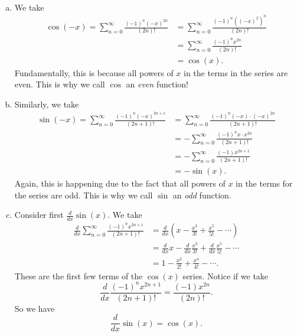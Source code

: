 \documentclass[12pt]{article} %
\begin{document}
\begin{solution}~
\begin{enumerate}[(a)]
    \item We take
    \begin{align*}
        \cos(-x)=\sum_{n=0}^\infty \frac{(-1)^n (-x)^{2n}}{(2n)!} &= \sum_{n=0}^\infty \frac{(-1)^n \left((-x)^2\right)^n}{(2n)!}\\
        &= \sum_{n=0}^\infty \frac{(-1)^n x^{2n}}{(2n)!}\\
        &= \cos(x).
    \end{align*}
    Fundamentally, this is because all powers of $x$ in the terms in the series are even.  This is why we call $\cos$ an \emph{even} function!
    \item Similarly, we take
    \begin{align*}
        \sin(-x)=\sum_{n=0}^\infty \frac{(-1)^n (-x)^{2n+1}}{(2n+1)!}&= \sum_{n=0}^\infty \frac{(-1)^n (-x)\cdot (-x)^{2n}}{(2n+1)!}\\
        &= -\sum_{n=0}^\infty \frac{(-1)^n x\cdot x^{2n}}{(2n+1)!}\\
        &= -\sum_{n=0}^\infty \frac{(-1) x^{2n+1}}{(2n+1)!}\\
        &= -\sin(x).
    \end{align*}
    Again, this is happening due to the fact that all powers of $x$ in the terms for the series are odd. This is why we call $\sin$ an \emph{odd} function.
    \item Consider first $\frac{d}{dx} \sin(x)$.  We take
    \begin{align*}
        \frac{d}{dx} \sum_{n=0}^\infty \frac{(-1)^n x^{2n+1}}{(2n+1)!} &= \frac{d}{dx} \left( x-\frac{x^3}{3!}+\frac{x^5}{5!} - \cdots \right)\\
        &= \frac{d}{dx} x -\frac{d}{dx} \frac{x^3}{3!} +\frac{d}{dx} \frac{x^5}{5!} - \cdots\\
        &= 1 - \frac{x^2}{2!} +\frac{x^4}{4!} - \cdots.
    \end{align*}
    These are the first few terms of the $\cos(x)$ series.  Notice if we take
    \[
    \frac{d}{dx} \frac{(-1)^n x^{2n+1}}{(2n+1)!} = \frac{(-1) x^{2n}}{(2n)!}.
    \]
    So we have
    \[
    \frac{d}{dx} \sin(x) = \cos(x).
    \]
    

\end{enumerate}
\end{solution}
\end{document}
